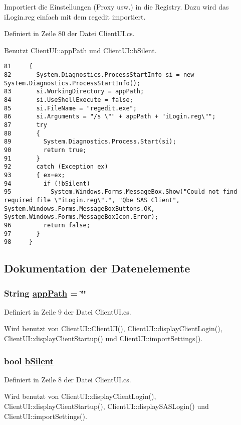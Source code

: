 Importiert die Einstellungen (Proxy usw.) in die Registry. Dazu wird das i\-Login.reg einfach mit dem regedit importiert. 



Definiert in Zeile 80 der Datei Client\-UI.cs.

Benutzt Client\-UI::app\-Path und Client\-UI::b\-Silent.



\footnotesize\begin{verbatim}81     {
82       System.Diagnostics.ProcessStartInfo si = new System.Diagnostics.ProcessStartInfo();
83       si.WorkingDirectory = appPath;
84       si.UseShellExecute = false;
85       si.FileName = "regedit.exe";
86       si.Arguments = "/s \"" + appPath + "iLogin.reg\"";
87       try 
88       {
89         System.Diagnostics.Process.Start(si);
90         return true;
91       } 
92       catch (Exception ex)
93       { ex=ex;
94         if (!bSilent)
95           System.Windows.Forms.MessageBox.Show("Could not find required file \"iLogin.reg\".", "Qbe SAS Client", System.Windows.Forms.MessageBoxButtons.OK, System.Windows.Forms.MessageBoxIcon.Error);
96         return false;
97       }
98     }
\end{verbatim}\normalsize 


\subsection{Dokumentation der Datenelemente}
\hypertarget{classQbeSAS_1_1ClientUI_QbeSAS_1_1ClientUIr1}{
\subsubsection[appPath]{\setlength{\rightskip}{0pt plus 5cm}String \hyperlink{classQbeSAS_1_1ClientUI_QbeSAS_1_1ClientUIr1}{app\-Path} = \char`\"{}\char`\"{}}}
\label{classQbeSAS_1_1ClientUI_QbeSAS_1_1ClientUIr1}




Definiert in Zeile 9 der Datei Client\-UI.cs.

Wird benutzt von Client\-UI::Client\-UI(), Client\-UI::display\-Client\-Login(), Client\-UI::display\-Client\-Startup() und Client\-UI::import\-Settings().\hypertarget{classQbeSAS_1_1ClientUI_QbeSAS_1_1ClientUIr0}{
\subsubsection[bSilent]{\setlength{\rightskip}{0pt plus 5cm}bool \hyperlink{classQbeSAS_1_1ClientUI_QbeSAS_1_1ClientUIr0}{b\-Silent}}}
\label{classQbeSAS_1_1ClientUI_QbeSAS_1_1ClientUIr0}




Definiert in Zeile 8 der Datei Client\-UI.cs.

Wird benutzt von Client\-UI::display\-Client\-Login(), Client\-UI::display\-Client\-Startup(), Client\-UI::display\-SASLogin() und Client\-UI::import\-Settings().